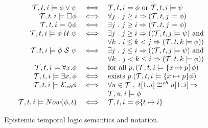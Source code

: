\documentclass{sig-alternate}
\theoremstyle{definition}
\newcommand{\aset}[1]{\{#1\}}
\newcommand{\sch}{\textit{ch}}
\newcommand{\tr}{t}
\newcommand{\tset}{\mathcal{T}}
\newcommand{\tnext}{\mathcal{X}}
\newcommand{\talways}{\square}
\newcommand{\tevent}{\lozenge}
\newcommand{\tuntil}{~\mathcal{U}~}
\newcommand{\tsince}{~\mathcal{S}~}
\newcommand{\tknows}[1]{\mathcal{K}_{#1}}
\begin{document}
{\begin{figure*}[t]
\begin{displaymath}
\begin{array}{rcl}
      \tset, \tr, i  \models \phi \lor \psi & \iff &
      \tset, \tr, i  \models \phi \hbox{ or } \tset, \tr, i  \models \psi \\


      \tset, \tr, i  \models \talways \phi & \iff &
      \forall j ~.~ j \geq i \Rightarrow (\tset, \tr, j  \models \phi) \\

      \tset, \tr, i  \models \tevent \phi & \iff &
      \exists j ~.~ j \geq i \Rightarrow (\tset, \tr, j  \models \phi) \\

      \tset, \tr, i  \models \phi \tuntil \psi & \iff &
      \exists j ~.~ j \geq i \Rightarrow ((\tset, \tr, j  \models \psi)
      \hbox{ and } \\
      & & \forall k ~.~ i \leq k < j \Rightarrow (\tset, \tr, k 
      \models \phi)) \\

      \tset, \tr, i  \models \phi \tsince \psi & \iff &
      \exists j ~.~ j \leq i \Rightarrow ((\tset, \tr, j  \models \psi)
      \hbox{ and } \\
      & & \forall k ~.~ j < k \leq i \Rightarrow (\tset, \tr, k 
      \models \phi)) \\

      \tset, \tr, i  \models \forall x . \phi & \iff &
      \hbox{for all } p, (\tset, \tr, i  \models \aset{x\mapsto p} \phi) \\

      \tset, \tr, i  \models \exists x , \phi & \iff &
      \hbox{exists } p. (\tset, \tr, i  \models \aset{x\mapsto p} \phi) \\

      \tset, \tr, i  \models \tknows{\sch} \phi & \iff &
      \forall u \in \tset ~,~
      \tr[1..i] \cong^{\sch} u[1..i] \Rightarrow \\ & & 
        \tset, u, i  \models
      \phi \\

      \tset, \tr, i  \models Now(\phi,t) & \iff &
       \tset, \tr, i \models \phi \aset{t\mapsto i} \\

    \end{array}
  \end{displaymath}
  \label{fig:etl}
  \caption{Epistemic temporal logic semantics and notation.}
\end{figure*}

}
\end{document}
